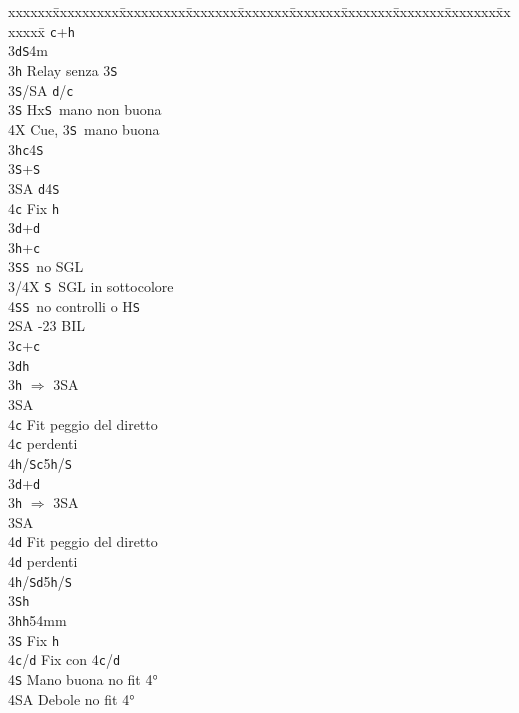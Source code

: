 \documentclass[a4paper,italian]{article}
\newcommand{\BS}{\small{\texttt{S}}}
\newcommand{\BC}{\small{\texttt{c}}}
\newcommand{\BD}{\small{\texttt{d}}}
\newcommand{\BH}{\small{\texttt{h}}}
\newenvironment{bidtable}
{\begin{tabbing}

    xxxxxx\=xxxxxxxxx\=xxxxxxxxx\=xxxxxxx\=xxxxxxx\=xxxxxxx\=xxxxxxx\=xxxxxxx\=xxxxxxx\=xxxxxxx\=\kill}
{\end{tabbing} }%
\begin{document}
\begin{multicols}{2}
    \begin{bidtable}
        \>\BC {}+\BH \+\+\+\\
        3\BD {}\BS 4m\+\\
        3\BH \> Relay senza 3\BS\+\\
        3\BS/SA \BD/\BC\-\\
        3\BS \> Hx\BS\ mano non buona\\
        4X \> Cue, 3\BS\ mano buona\-\\
        3\BH {}\BC 4\BS \\
        3\BS {}+\BS \\
        3\small{SA} \BD 4\BS \\
        4\BC \> Fix \BH \-\\
        3\BD {}+\BD \\
        3\BH {}+\BC \\
        3\BS {}\BS\ no SGL\\
        3/4X \BS\ SGL in sottocolore\\
        4\BS {}\BS\ no controlli o H\BS \-\\
        2\small{SA} -23 BIL\\
        3\BC {}+\BC \+\\
        3\BD {}\BH \\
        3\BH \> $\Rightarrow$ 3\small{SA}\+\\
        3\small{SA}\+\\
        4\BC \> Fit peggio del diretto\-\\
        4\BC {} perdenti\\
        4\BH/\BS {}\BC 5\BH /\BS \-\-\\
        3\BD {}+\BD \+\\
        3\BH \> $\Rightarrow$ 3\small{SA}\+\\
        3\small{SA}\+\\
        4\BD \> Fit peggio del diretto\-\\
        4\BD {} perdenti\\
        4\BH/\BS {}\BD 5\BH /\BS \-\\
        3\BS {}\BH \-\\
        3\BH {}\BH 54mm\+\\
        3\BS \> Fix \BH \\
        4\BC/\BD \> Fix con 4\BC/\BD\\
        4\BS \> Mano buona no fit 4°\\
        4\small{SA} \> Debole no fit 4°\-\\

\end{bidtable}
\end{multicols}
\end{document}
